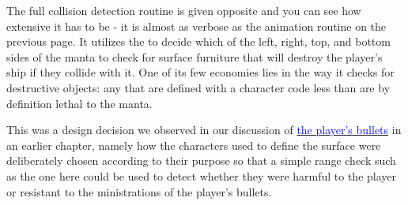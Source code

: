 The full collision detection routine is given opposite and you can see how extensive it has to be - it is almost as verbose
as the animation routine on the previous page. It utilizes the  to decide which of the left,
right, top, and bottom sides of the manta to check for surface furniture that will destroy the player's ship if they collide
with it. One of its few economies lies in the way it checks for destructive objects: any that are defined with a character code
less than  are by definition lethal to the manta. 

This was a design decision we observed in our discussion of
\hyperref[sec:bangbang]{\textcolor{blue}{the player's bullets}} in an earlier chapter,
namely how the characters used to define the surface were deliberately chosen according to their purpose so that a simple
range check such as the one here could be used to detect whether they were harmful to the player or resistant to the ministrations
of the player's bullets.

